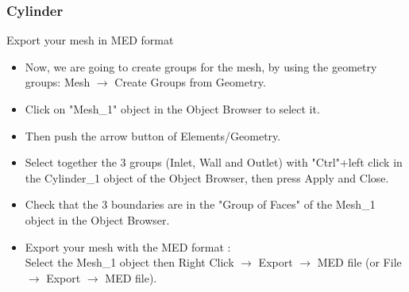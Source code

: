 \documentclass[10pt, hyperref={unicode=true,pdfusetitle, bookmarks=true,bookmarksnumbered=false,bookmarksopen=false, breaklinks=false,pdfborder={0 0 1},backref=true,colorlinks=true,linkcolor=darkblue,pageanchor}]{beamer}
\begin{document}
\begin{frame}
\frametitle{Cylinder}
\begin{block}{Export your mesh in MED format}

\begin{itemize}
\item Now, we are going to create groups for the mesh, by using the geometry groups: Mesh $\rightarrow$ Create Groups from Geometry.
\item Click on "Mesh\_1" object in the Object Browser to select it.
\item Then push the arrow button of Elements/Geometry.
\item Select together the 3 groups (Inlet, Wall and Outlet) with "Ctrl"+left click in the Cylinder\_1 object of the Object Browser, then press Apply and Close.
\item Check that the 3 boundaries are in the "Group of Faces" of the Mesh\_1 object in the Object Browser.
\item Export your mesh with the MED format :\\
Select the Mesh\_1 object then Right Click $\rightarrow$ Export $\rightarrow$ MED file (or File $\rightarrow$ Export $\rightarrow$ MED file).
\end{itemize}

\end{block}
\end{frame}
\end{document}
